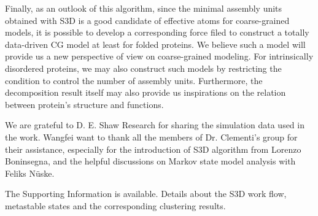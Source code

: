 \documentclass[journal=jacsat,manuscript=article]{achemso}
\begin{document}
Finally, as an outlook of this algorithm, since the minimal assembly units obtained with S3D is a good candidate of effective atoms for coarse-grained models, it is possible to develop a corresponding force filed to construct a totally data-driven CG model at least for folded proteins. We believe such a model will provide us a new perspective of view on coarse-grained modeling. For intrinsically disordered proteins, we may also construct such models by restricting the condition to control the number of assembly units. Furthermore, the decomposition result itself may also provide us inspirations on the relation between protein's structure and functions.

\begin{acknowledgement}

We are grateful to D. E. Shaw Research for sharing the simulation data used in the work.  Wangfei want to thank all the members of Dr. Clementi's group for their assistance, especially for the introduction of S3D algorithm from Lorenzo Boninsegna, and the helpful discussions on Markov state model analysis with Feliks Nüske. %

\end{acknowledgement}

\begin{suppinfo}

The Supporting Information is available. Details about the S3D work flow, metastable states and the corresponding clustering results.

\end{suppinfo}


\end{document}
